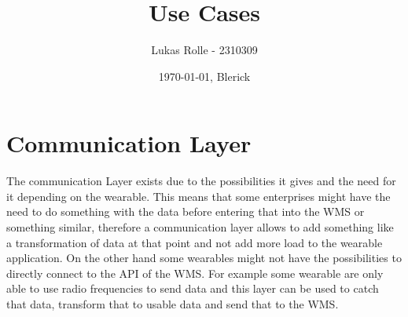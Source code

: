 \documentclass{report}
\author{Lukas Rolle - 2310309}
\title{Use Cases}
\date{\today, Blerick}
\begin{document}
\maketitle
\tableofcontents





\chapter{Communication Layer}
The communication Layer exists due to the possibilities it gives and the need for it depending on the wearable. This means that some enterprises might have the need to do something with the data before entering that into the WMS or something similar, therefore a communication layer allows to add something like a transformation of data at that point and not add more load to the wearable application. On the other hand some wearables might not have the possibilities to directly connect to the API of the WMS. For example some wearable are only able to use radio frequencies to send data and this layer can be used to catch that data, transform that to usable data and send that to the WMS.



\end{document}
